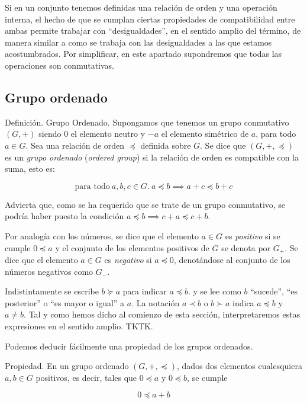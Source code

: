


Si en un conjunto tenemos definidas una relación de orden y una operación
interna, el hecho de que se cumplan ciertas propiedades de compatibilidad
entre ambas permite trabajar con ``desigualdades'', en el sentido amplio del
término, de manera similar a como se trabaja con las desigualdades a las que
estamos acostumbrados. Por simplificar, en este apartado supondremos que
todas las operaciones son conmutativas.





\subsection{Grupo ordenado}

Definición. Grupo Ordenado. Supongamos que tenemos un grupo conmutativo $(G,
+)$ siendo $0$ el elemento neutro y ${-a}$ el elemento simétrico de $a$,
para todo $a \in G$. Sea una relación de orden $\preceq$ definida sobre $G$.
Se dice que $(G, +, \preceq)$ es un \emph{grupo ordenado} (\emph{ordered
group}) si la relación de orden es compatible con la suma, esto es:

$$ \text{para todo} \ a, b, c \in G. \ a \preceq b \implies a + c \preceq b
+ c $$

\noindent Advierta que, como se ha requerido que se trate de un grupo
conmutativo, se podría haber puesto la condición $a \preceq b \implies c + a
\preceq c + b$.

Por analogía con los números, se dice que el elemento $a \in G$ es
\emph{positivo} si se cumple $0 \preceq a$ y el conjunto de los elementos
positivos de $G$ se denota por $G_+$. Se dice que el elemento $a \in G$ es
\emph{negativo} si $a \preceq 0$, denotándose al conjunto de los números
negativos como $G_{-}$.

Indistintamente se escribe $b \succeq a$ para indicar $a \preceq b$. y se
lee como $b$ ``sucede'', ``es posterior'' o ``es mayor o igual'' a $a$. La
notación $a \prec b$ o $b \succ a$ indica $a \preceq b$ y $a \neq b$. Tal y
como hemos dicho al comienzo de esta sección, interpretaremos estas
expresiones en el sentido amplio. TKTK.

Podemos deducir fácilmente una propiedad de los grupos ordenados.

Propiedad. En un grupo ordenado $(G, +, \preceq)$, dados dos elementos
cualesquiera $a, b \in G$ positivos, es decir, tales que $0 \preceq a$ y $0
\preceq b$, se cumple

$$ 0 \preceq a + b $$

